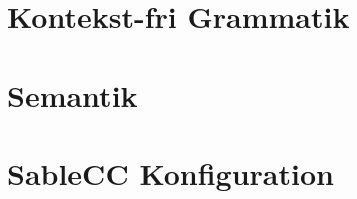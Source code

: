 \appendix


\chapter{Kontekst-fri Grammatik}
\label{bil:cfg}


\label{FIRSTAPPENDIX} %

\chapter{Semantik}
\label{bil:semantik}


\chapter{SableCC Konfiguration}
\label{bil:sablecc}



%

%

\label{LASTAPPENDIX}
